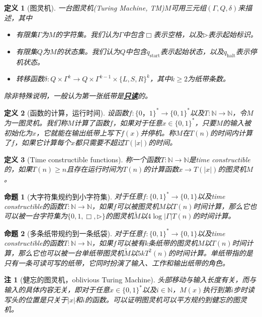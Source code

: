 \documentclass[8pt]{article}
\theoremstyle{compact}
\newtheorem{definition}{定义}
\newtheorem{proposition}{命题}
\newtheorem{remark}{注}
\def\obj#1{\textbf{\uline{#1}}}
\def\ge{\geqslant}
\begin{document}
\begin{definition}[图灵机]
	一台图灵机(Turing Machine, TM)$M$可用三元组$(\Gamma, Q, \delta)$来描述，其中
	\begin{itemize}
		\item 有限集$\Gamma$为$M$的字符集。我们认为$\Gamma$中包含$\Box$表示空格，以及$\triangleright$表示起始标识。
		\item 有限集$Q$为$M$的状态集。我们认为$Q$中包含$q_{\text{start}}$表示起始状态，以及$q_{\text{halt}}$表示停机状态。
		\item 转移函数$\delta: Q \times \Gamma^{k} \to Q \times \Gamma^{k-1} \times \{L, S, R\}^{k}$，其中$k \ge 2$为纸带条数。
	\end{itemize}
	除非特殊说明，一般认为第一张纸带是\obj{只读}的。
\end{definition}
\begin{definition}[函数的计算，运行时间]
	设函数$f: \{0， 1\}^* \to \{0, 1\}^*$以及$T: \mathbb{N} \to \mathbb{N}$，令$M$为一图灵机。我们称$M$计算了函数$f$，如果对于任意$x \in \{0, 1\}^*$，只要$M$的输入被初始化为$x$，它就能在输出纸带上写下$f(x)$并停机。称$M$在$T(n)$的时间内计算了$f$，如果它计算每个$x$都只需要不超过$T(|x|)$的时间。
\end{definition}
\begin{definition}[Time constructible functions]
	称一个函数$T: \mathbb N \to \mathbb N$是time constructible的，如果$T(n) \ge n$且存在运行时间为$T(n)$的计算函数$x \to T(|x|)$的图灵机$M$。
\end{definition}
\begin{proposition}[大字符集规约到小字符集]
	对于任意$f: \{0, 1\}^* \to \{0, 1\}$以及time constructible的函数$T: \mathbb{N} \to \mathbb{N}$，如果$f$可以被图灵机$M$以$T(n)$时间计算，那么它也可以被一台字符集为$\{0, 1, \Box, \triangleright\}$的图灵机$\tilde{M}$以$4\log |\Gamma|T(n)$的时间计算。
\end{proposition}
\begin{proposition}[多条纸带规约到一条纸袋]
	对于任意$f: \{0, 1\}^* \to \{0, 1\}$以及time constructible的函数$T: \mathbb{N} \to \mathbb{N}$，如果$f$可以被有$k$条纸带的图灵机$M$以$T(n)$时间计算，那么它也可以被一台单纸带图灵机$\tilde{M}$以$5kT^2(n)$的时间计算。单纸带指的是只有一条可读可写的纸带，它同时扮演了输入、工作和输出纸带的角色。
\end{proposition}
\begin{remark}[健忘的图灵机，oblivious Turing Machine]
	头部移动与输入长度有关，而与输入的具体内容无关，即对于任意$x \in \{0, 1\}^*$以及$i \in \mathbb N$，$M(x)$执行到第$i$步时读写头的位置是只关于$|x|$和$i$的函数。可以证明图灵机可以平方规约到健忘的图灵机。
\end{remark}
\end{document}
